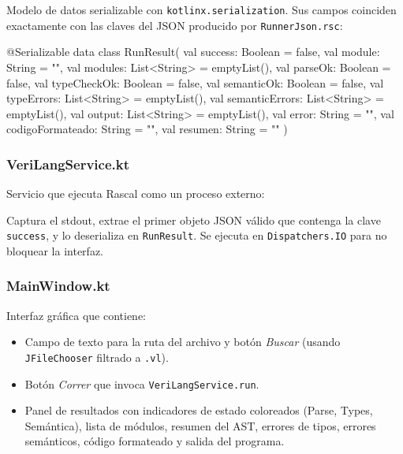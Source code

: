 \documentclass[12pt]{article}
\newcommand{\code}[1]{\texttt{#1}}
\begin{document}
Modelo de datos serializable con \code{kotlinx.serialization}. Sus campos
coinciden exactamente con las claves del JSON producido por
\code{RunnerJson.rsc}:

\begin{kotlin}
@Serializable
data class RunResult(
    val success: Boolean = false,
    val module: String = "",
    val modules: List<String> = emptyList(),
    val parseOk: Boolean = false,
    val typeCheckOk: Boolean = false,
    val semanticOk: Boolean = false,
    val typeErrors: List<String> = emptyList(),
    val semanticErrors: List<String> = emptyList(),
    val output: List<String> = emptyList(),
    val error: String = "",
    val codigoFormateado: String = "",
    val resumen: String = ""
)
\end{kotlin}

\subsubsection*{VeriLangService.kt}

Servicio que ejecuta Rascal como un proceso externo:


Captura el stdout, extrae el primer objeto JSON válido que contenga la
clave \texttt{success}, y lo deserializa en \code{RunResult}. Se ejecuta
en \code{Dispatchers.IO} para no bloquear la interfaz.

\subsubsection*{MainWindow.kt}

Interfaz gráfica que contiene:
\begin{itemize}
  \item Campo de texto para la ruta del archivo y botón \textit{Buscar}
        (usando \code{JFileChooser} filtrado a \code{.vl}).
  \item Botón \textit{Correr} que invoca \code{VeriLangService.run}.
  \item Panel de resultados con indicadores de estado coloreados
        (Parse, Types, Semántica), lista de módulos, resumen del AST,
        errores de tipos, errores semánticos, código formateado y
        salida del programa.
\end{itemize}
\end{document}
